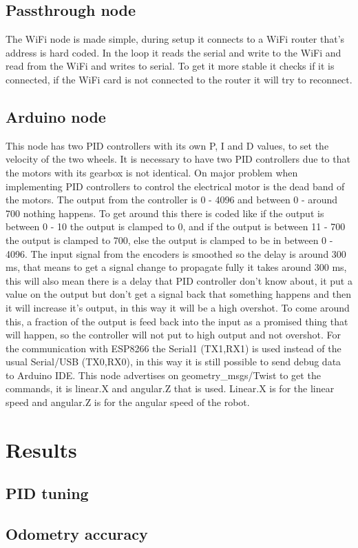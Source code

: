 \documentclass[11pt]{article}
\begin{document}
\subsection{Passthrough node}
The WiFi node is made simple, during setup it connects to a WiFi router that's address is hard coded. In the loop it reads the serial and write to the WiFi and read from the WiFi and writes to serial. To get it more stable it checks if it is connected, if the WiFi card is not connected to the router it will try to reconnect.
\label{subsec:ptn}

\subsection{Arduino node}
This node has two PID controllers with its own P, I and D values, to set the velocity of the two wheels. It is necessary to have two PID controllers due to that the motors with its gearbox is not identical.
On major problem when implementing PID controllers to control the electrical motor is the dead band of the motors. The output from the controller is 0 - 4096 and between 0 - around 700 nothing happens. To get around this there is coded like if the output is between 0 - 10 the output is clamped to 0, and if the output is between 11 - 700 the output is clamped to 700, else the output is clamped to be in between 0 - 4096.
The input signal from the encoders is smoothed so the delay is around 300 ms, that means to get a signal change to propagate fully it takes around 300 ms, this will also mean there is a delay that PID controller don't know about, it put a value on the output but don't get a signal back that something happens and then it will increase it's output, in this way it will be a high overshot. To come around this, a fraction of the output is feed back into the input as a promised thing that will happen, so the controller will not put to high output and not overshot.
For the communication with ESP8266 the Serial1 (TX1,RX1) is used instead of the usual Serial/USB (TX0,RX0), in this way it is still possible to send debug data to Arduino IDE.
This node advertises on geometry_msgs/Twist to get the commands, it is linear.X and angular.Z that is used. Linear.X is for the linear speed and angular.Z is for the angular speed of the robot. 
\label{subsec:dd}

\section{Results}

\subsection{PID tuning}
\label{subsec:pidt}

\subsection{Odometry accuracy}


\end{document}

